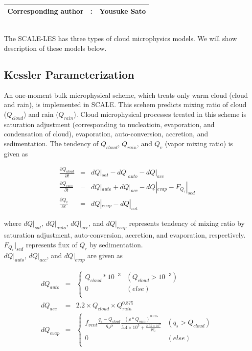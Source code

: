{\bf \Large
\begin{tabular}{ccc}
\hline
  Corresponding author & : & Yousuke Sato\\
\hline
\end{tabular}
}
\\
 The SCALE-LES has three types of cloud microphysics models. We will show description of these models below.

\subsection{Kessler Parameterization}
An one-moment bulk microphysical scheme, which treats only warm cloud (cloud and rain), is implemented in SCALE. This scehem predicts mixing ratio of cloud ($Q_{cloud}$) and rain ($Q_{rain}$). Cloud microphysical processes treated in this scheme is saturation adjustment (corresponding to nucleatioin, evaporation, and condensation of cloud), evaporation, auto-conversion, accretion, and sedimentation. The tendency of $Q_{cloud}$, $Q_{rain}$, and $Q_{v}$ (vapor mixing ratio) is given as

\begin{eqnarray}
\frac{\partial Q_{cloud}}{\partial t}&=&dQ|_{sat}-dQ|_{auto}-dQ|_{acc}\\
\frac{\partial Q_{rain}}{\partial t}&=&dQ|_{auto}+dQ|_{acc}-dQ|_{evap}-F_{Q_{r}}|_{sed}\\
\frac{\partial Q_{v}}{\partial t}&=&dQ|_{evap}-dQ|_{sat}
\end{eqnarray}

where $dQ|_{sat}$, $dQ|_{auto}$, $dQ|_{acc}$, and $dQ|_{evap}$ represents tendency of mixing ratio by saturation adjustment, auto-conversion, accretion, and evaporation, respectively. $F_{Q_{r}}|_{sed}$ represents flux of $Q_{r}$ by sedimentation.\\ $dQ|_{auto}$, $dQ|_{acc}$, and $dQ|_{evap}$ are given as

\begin{eqnarray}
dQ_{auto}&=&\left\{
\begin{array}{ll}
Q_{cloud}*10^{-3} & (Q_{cloud}>10^{-3})\\
0 & (else)\\
\end{array}\right.\\
dQ_{acc}&=&2.2\times Q_{cloud}\times Q_{rain}^{0.875}\\
dQ_{evap}&=&\left\{
\begin{array}{ll}
f_{vent} \frac{q_{s}-Q_{cloud}}{q_{s}\rho}\frac{(\rho*Q_{rain})^{0.525}}{5.4\times 10^{5}+\frac{2.55\times 10^{8}}{pq_{s}}} & ( q_{s} > Q_{cloud})\\
0 & (else)\\
\end{array} \right.
\end{eqnarray}

